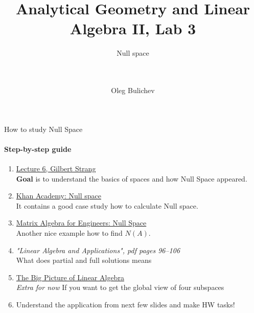 \documentclass[aspectratio=169]{beamer}
\title[AGLA2]{Analytical Geometry and Linear Algebra II, Lab 3} %
\subtitle{Null space \\ \ \\ \ 
         } %
\author{Oleg Bulichev}
\newcommand{\fbckg}[1]{\usebackgroundtemplate{\texttt{[image: \#1]}}}%
\begin{document}
\fbckg{fibeamer/figs/title_page.png}

\fbckg{fibeamer/figs/common.png}




\begin{frame}[t]{How to study Null Space}
    \framesubtitle{Step-by-step guide}
    \vspace{-0.65cm}
    \small
    \begin{enumerate}
        \item \href{https://youtu.be/8o5Cmfpeo6g}{Lecture 6, Gilbert Strang} \\ \textbf{Goal} is to understand the basics of spaces and how Null Space appeared.
        \item \href{https://www.youtube.com/watch?v=_uTAdf_AsfQ}{Khan Academy: Null space} \\ It contains a good case study how to calculate Null space.
        \item \href{https://www.youtube.com/watch?v=C8zOd07U3l8}{Matrix Algebra for Engineers: Null Space} \\ Another nice example how to find $N(A)$.
        \item \textit{"Linear Algebra and Applications", pdf pages 96--106 } \\ What does partial and full solutions means
        \item \href{https://www.youtube.com/watch?v=ggWYkes-n6E}{The Big Picture of Linear Algebra} \\ \textit{Extra for now} If you want to get the global view of four subspaces
        \item Understand the application from next few slides and make HW tasks!
    \end{enumerate}
\end{frame}
\end{document}
